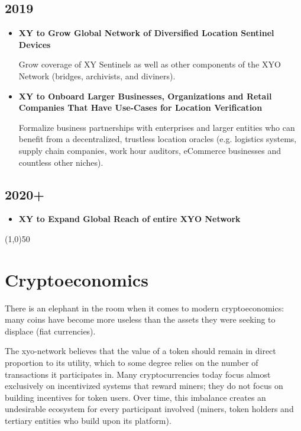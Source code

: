 \documentclass{article}
\begin{document}
\subsection{2019}
\begin{itemize}
\item \textbf{XY to Grow Global Network of Diversified Location Sentinel Devices}

Grow coverage of XY Sentinels as well as other components of the XYO Network (\Glspl{bridge}, \Glspl{archivist}, and \Glspl{diviner}).

\item \textbf{XY to Onboard Larger Businesses, Organizations and Retail Companies That Have Use-Cases for Location Verification}

Formalize business partnerships with enterprises and larger entities who can benefit from a decentralized, \gls{trustless} location \glspl{oracle} (e.g. logistics systems, supply chain companies, work hour auditors, eCommerce businesses and countless other niches).

\end{itemize}

\subsection{2020+}
\begin{itemize}
\item \textbf{XY to Expand Global Reach of entire XYO Network}
\end{itemize}

\begin{center}
\line(1,0){50}
\end{center}

\section{Cryptoeconomics}

There is an elephant in the room when it comes to modern \gls{cryptoeconomics}: many coins have become more useless than the assets they were seeking to displace (fiat currencies).

The \Gls{xyo-network} believes that the value of a token should remain in direct proportion to its utility, which to some degree relies on the number of transactions it participates in. Many cryptocurrencies today focus almost exclusively on incentivized systems that reward miners; they do not focus on building incentives for token users. Over time, this imbalance creates an undesirable ecosystem for every participant involved (miners, token holders and tertiary entities who build upon its platform).
\end{document}
